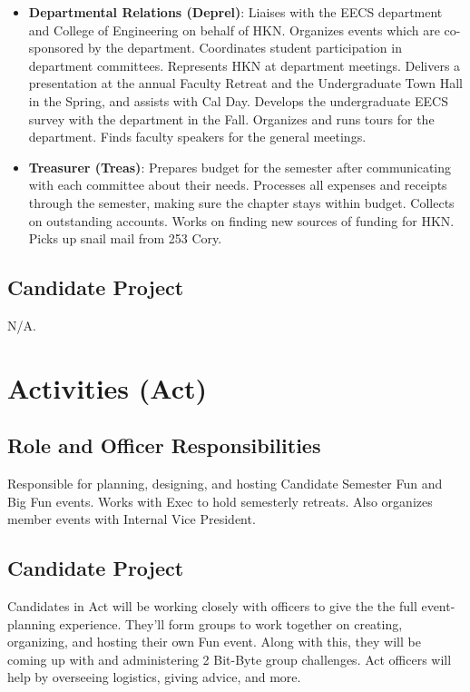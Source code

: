 \documentclass[11pt, article, oneside]{memoir}
\begin{document}
\begin{itemize}
            \item \textbf{Departmental Relations (Deprel)}: Liaises with the EECS department and College of Engineering on behalf of HKN. Organizes events which are co-sponsored by the department. Coordinates student participation in department committees. Represents HKN at department meetings. Delivers a presentation at the annual Faculty Retreat and the Undergraduate Town Hall in the Spring, and assists with Cal Day. Develops the undergraduate EECS survey with the department in the Fall. Organizes and runs tours for the department. Finds faculty speakers for the general meetings.
            \item \textbf{Treasurer (Treas)}: Prepares budget for the semester after communicating with each committee about their needs. Processes all expenses and receipts through the semester, making sure the chapter stays within budget. Collects on outstanding accounts. Works on finding new sources of funding for HKN. Picks up snail mail from 253 Cory. 
        \end{itemize}

    \subsection{Candidate Project}
        N/A.

    \bigbreak

    \section{Activities (Act)}
    \subsection{Role and Officer Responsibilities}
        Responsible for planning, designing, and hosting Candidate Semester Fun and Big Fun events. Works with Exec to hold semesterly retreats. Also organizes member events with Internal Vice President.

    \subsection{Candidate Project}
        Candidates in Act will be working closely with officers to give the the full event-planning experience. They'll form groups to work together on creating, organizing, and hosting their own Fun event. Along with this, they will be coming up with and administering 2 Bit-Byte group challenges. Act officers will help by overseeing logistics, giving advice, and more. 
    
\end{document}
